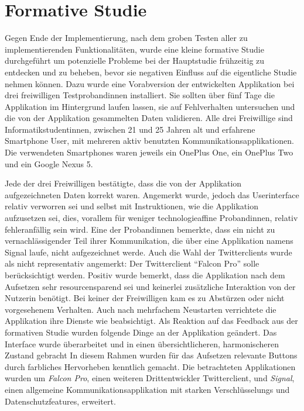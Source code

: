 \section{Formative Studie}

Gegen Ende der Implementierung, nach dem groben Testen aller zu implementierenden Funktionalitäten, wurde eine kleine formative Studie durchgeführt um potenzielle Probleme bei der Hauptstudie frühzeitig zu entdecken und zu beheben, bevor sie negativen Einfluss auf die eigentliche Studie nehmen können.
Dazu wurde eine Vorabversion der entwickelten Applikation bei drei freiwilligen Testprobandinnen installiert.
Sie sollten über fünf Tage die Applikation im Hintergrund laufen lassen, sie auf Fehlverhalten untersuchen und die von der Applikation gesammelten Daten validieren.
Alle drei Freiwillige sind Informatikstudentinnen, zwischen 21 und 25 Jahren alt und erfahrene Smartphone User, mit mehreren aktiv benutzten Kommunikationsapplikationen.
Die verwendeten Smartphones waren jeweils ein OnePlus One, ein OnePlus Two und ein Google Nexus 5.
\par
Jede der drei Freiwilligen bestätigte, dass die von der Applikation aufgezeichneten Daten korrekt waren.
Angemerkt wurde, jedoch das Userinterface relativ verworren sei und selbst mit Instruktionen, wie die Applikation aufzusetzen sei, dies, vorallem für weniger technologieaffine Probandinnen, relativ fehleranfällig sein wird.
Eine der Probandinnen bemerkte, dass ein nicht zu vernachlässigender Teil ihrer Kommunikation, die über eine Applikation namens Signal laufe, nicht aufgezeichnet werde.
Auch die Wahl der Twitterclients wurde als nicht representativ angemerkt:
Der Twitterclient "`Falcon Pro"' solle berücksichtigt werden.
Positiv wurde bemerkt, dass die Applikation nach dem Aufsetzen sehr resourcensparend sei und keinerlei zusätzliche Interaktion von der Nutzerin benötigt.
Bei keiner der Freiwilligen kam es zu Abstürzen oder nicht vorgesehenem Verhalten. Auch nach mehrfachem Neustarten verrichtete die Applikation ihre Dienste wie beabsichtigt.
Als Reaktion auf das Feedback aus der formativen Studie wurden folgende Dinge an der Applikation geändert.
Das Interface wurde überarbeitet und in einen übersichtlicheren, harmonischeren Zustand gebracht
In diesem Rahmen wurden für das Aufsetzen relevante Buttons durch farbliches Hervorheben kenntlich gemacht.
Die betrachteten Applikationen wurden um \emph{Falcon Pro}, einen weiteren Drittentwickler Twitterclient, und \emph{Signal}, einen allgemeine Kommunikationsapplikation mit starken Verschlüsselungs und Datenschutzfeatures, erweitert.
